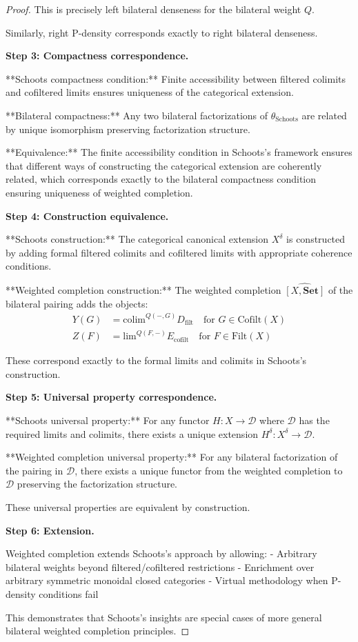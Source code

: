 \documentclass[11pt]{article}
\theoremstyle{plain}
\theoremstyle{definition}
\theoremstyle{remark}
\newcommand{\colim}{\mathrm{colim}}
\renewcommand{\lim}{\mathrm{lim}}
\newcommand{\wh}[1]{\widehat{#1}}
\begin{document}
\begin{proof}
This is precisely left bilateral denseness for the bilateral weight $Q$.

Similarly, right P-density corresponds exactly to right bilateral denseness.

\textbf{Step 3: Compactness correspondence.}

**Schoots compactness condition:** Finite accessibility between filtered colimits and cofiltered limits ensures uniqueness of the categorical extension.

**Bilateral compactness:** Any two bilateral factorizations of $\theta_{\text{Schoots}}$ are related by unique isomorphism preserving factorization structure.

**Equivalence:** The finite accessibility condition in Schoots's framework ensures that different ways of constructing the categorical extension are coherently related, which corresponds exactly to the bilateral compactness condition ensuring uniqueness of weighted completion.

\textbf{Step 4: Construction equivalence.}

**Schoots construction:** The categorical canonical extension $X^{\delta}$ is constructed by adding formal filtered colimits and cofiltered limits with appropriate coherence conditions.

**Weighted completion construction:** The weighted completion $\wh{[X, \mathbf{Set}]}$ of the bilateral pairing adds the objects:
\begin{align}
Y(G) &= \colim^{Q(-, G)} D_{\text{filt}} \quad \text{for } G \in \text{Cofilt}(X) \\
Z(F) &= \lim^{Q(F, -)} E_{\text{cofilt}} \quad \text{for } F \in \text{Filt}(X)
\end{align}

These correspond exactly to the formal limits and colimits in Schoots's construction.

\textbf{Step 5: Universal property correspondence.}

**Schoots universal property:** For any functor $H : X \to \mathcal{D}$ where $\mathcal{D}$ has the required limits and colimits, there exists a unique extension $H^{\delta} : X^{\delta} \to \mathcal{D}$.

**Weighted completion universal property:** For any bilateral factorization of the pairing in $\mathcal{D}$, there exists a unique functor from the weighted completion to $\mathcal{D}$ preserving the factorization structure.

These universal properties are equivalent by construction.

\textbf{Step 6: Extension.}

Weighted completion extends Schoots's approach by allowing:
- Arbitrary bilateral weights beyond filtered/cofiltered restrictions
- Enrichment over arbitrary symmetric monoidal closed categories
- Virtual methodology when P-density conditions fail

This demonstrates that Schoots's insights are special cases of more general bilateral weighted completion principles.
\end{proof}
\end{document}
